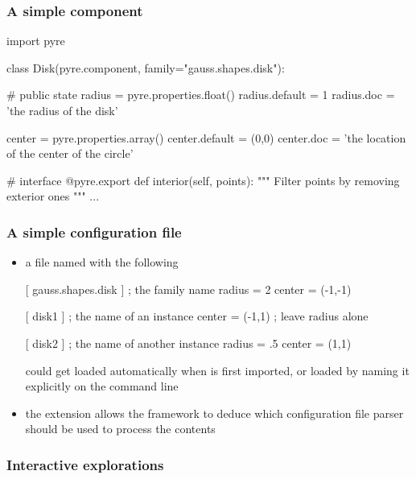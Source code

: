 \begin{frame}[fragile]
%
  \frametitle{A simple component}
%
  \begin{ipython}{}
import pyre

class Disk(pyre.component, family="gauss.shapes.disk"):

    # public state
    radius = pyre.properties.float()
    radius.default = 1
    radius.doc = 'the radius of the disk'

    center = pyre.properties.array()
    center.default = (0,0)
    center.doc = 'the location of the center of the circle'

    # interface
    @pyre.export
    def interior(self, points):
        """
        Filter {points} by removing exterior ones
        """
        ...
  \end{ipython}
%
\end{frame}

\begin{frame}[fragile]
%
  \frametitle{A simple configuration file}
%
  \begin{itemize}
%
  \item a file named  with the following
%
  \begin{icfg}{}
 [ gauss.shapes.disk ] ; the family name
 radius = 2
 center = (-1,-1)

 [ disk1 ] ; the name of an instance
 center = (-1,1)   ; leave {radius} alone

 [ disk2 ] ; the name of another instance
 radius = .5
 center = (1,1)
  \end{icfg}
%
  could get loaded automatically when  is first imported, or loaded by naming it
  explicitly on the command line
%
  \item the  extension allows the framework to deduce which configuration file
    parser should be used to process the contents
%
  \end{itemize}
%
\end{frame}

\begin{frame}[fragile]
%
  \frametitle{Interactive explorations}
%
\end{frame}

